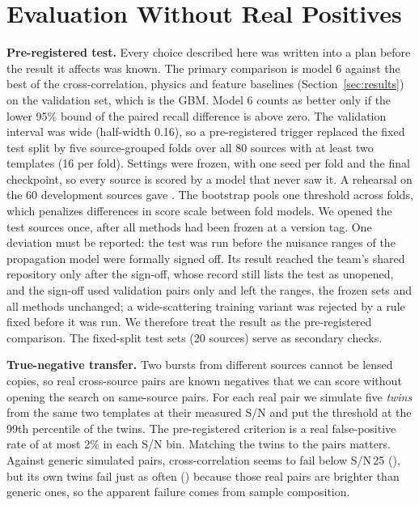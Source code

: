 \documentclass[conference]{IEEEtran}
\begin{document}
\section{Evaluation Without Real Positives}
\label{sec:validation}
\textbf{Pre-registered test.} Every choice described here was written into a plan before the result it affects was known.
The primary comparison is model 6 against the best of the cross-correlation, physics and feature baselines
(Section~\ref{sec:results}) on the validation set, which is the GBM. Model 6 counts as better only if the lower 95\% bound
of the paired recall difference is above zero. The validation interval was wide (half-width 0.16), so a pre-registered
trigger replaced the fixed test split by five source-grouped folds over all 80 sources with at least two templates (16 per
fold). Settings were frozen, with one seed per fold and the final checkpoint, so every source is scored by a model that
never saw it. A rehearsal on the 60 development sources gave \DiffOOF. The bootstrap pools one threshold across folds,
which penalizes differences in score scale between fold models. We opened the test sources once, after all methods had been
frozen at a version tag. One deviation must be reported: the test was run before the nuisance ranges of the propagation
model were formally signed off. Its result reached the team's shared repository only after the sign-off, whose record still lists
the test as unopened, and the sign-off used validation pairs only and left the ranges, the frozen sets and all methods
unchanged; a wide-scattering training variant was rejected by a rule fixed before it was run. We therefore treat the
result as the pre-registered comparison. The
fixed-split test sets (20 sources) serve as secondary checks.

\textbf{True-negative transfer.} Two bursts from different sources cannot be lensed copies, so real cross-source pairs are
known negatives that we can score without opening the search on same-source pairs. For each real pair we simulate five
\emph{twins} from the same two templates at their measured S/N and put the threshold at the 99th percentile of the twins.
The pre-registered criterion is a real false-positive rate of at most 2\% in each S/N bin. Matching the twins to the pairs
matters. Against generic simulated pairs, cross-correlation seems to fail below S/N\,25 (\BoneLowReal), but its own twins
fail just as often (\BoneLowTwin) because those real pairs are brighter than generic ones, so the apparent failure comes from
sample composition.
\end{document}
